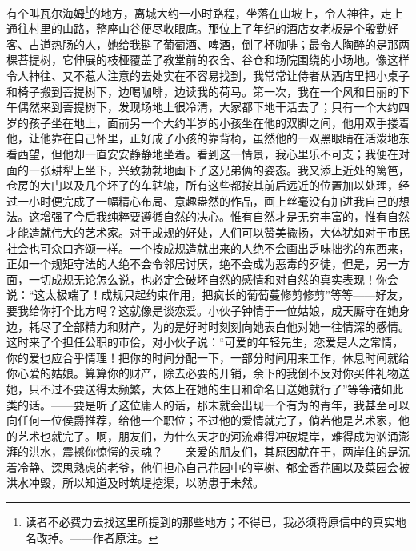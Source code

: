 \documentclass[12pt,oneside]{book}
\begin{document}
有个叫瓦尔海姆\footnote{读者不必费力去找这里所提到的那些地方；不得已，我必须将原信中的真实地名改掉。——作者原注。}的地方，离城大约一小时路程，坐落在山坡上，令人神往，走上通往村里的山路，整座山谷便尽收眼底。那位上了年纪的酒店女老板是个殷勤好客、古道热肠的人，她给我斟了葡萄酒、啤酒，倒了杯咖啡；最令人陶醉的是那两棵菩提树，它伸展的枝桠覆盖了教堂前的农舍、谷仓和场院围绕的小场地。像这样令人神往、又不惹人注意的去处实在不容易找到，我常常让侍者从酒店里把小桌子和椅子搬到菩提树下，边喝咖啡，边读我的荷马。第一次，我在一个风和日丽的下午偶然来到菩提树下，发现场地上很冷清，大家都下地干活去了；只有一个大约四岁的孩子坐在地上，面前另一个大约半岁的小孩坐在他的双脚之间，他用双手搂着他，让他靠在自己怀里，正好成了小孩的靠背椅，虽然他的一双黑眼睛在活泼地东看西望，但他却一直安安静静地坐着。看到这一情景，我心里乐不可支；我便在对面的一张耕犁上坐下，兴致勃勃地画下了这兄弟俩的姿态。我又添上近处的篱笆，仓房的大门以及几个坏了的车轱辘，所有这些都按其前后远近的位置加以处理，经过一小时便完成了一幅精心布局、意趣盎然的作品，画上丝毫没有加进我自己的想法。这增强了今后我纯粹要遵循自然的决心。惟有自然才是无穷丰富的，惟有自然才能造就伟大的艺术家。对于成规的好处，人们可以赞美揄扬，大体犹如对于市民社会也可众口齐颂一样。一个按成规造就出来的人绝不会画出乏味拙劣的东西来，正如一个规矩守法的人绝不会令邻居讨厌，绝不会成为恶毒的歹徒，但是，另一方面，一切成规无论怎么说，也必定会破坏自然的感情和对自然的真实表现！你会说：“这太极端了！成规只起约束作用，把疯长的葡萄蔓修剪修剪”等等——好友，要我给你打个比方吗？这就像是谈恋爱。小伙子钟情于一位姑娘，成天厮守在她身边，耗尽了全部精力和财产，为的是好时时刻刻向她表白他对她一往情深的感情。这时来了个担任公职的市侩，对小伙子说：“可爱的年轻先生，恋爱是人之常情，你的爱也应合乎情理！把你的时间分配一下，一部分时间用来工作，休息时间就给你心爱的姑娘。算算你的财产，除去必要的开销，余下的我倒不反对你买件礼物送她，只不过不要送得太频繁，大体上在她的生日和命名日送她就行了”等等诸如此类的话。——要是听了这位庸人的话，那末就会出现一个有为的青年，我甚至可以向任何一位侯爵推荐，给他一个职位；不过他的爱情就完了，倘若他是艺术家，他的艺术也就完了。啊，朋友们，为什么天才的河流难得冲破堤岸，难得成为汹涌澎湃的洪水，震撼你惊愕的灵魂？——亲爱的朋友们，其原因就在于，两岸住的是沉着冷静、深思熟虑的老爷，他们担心自己花园中的亭榭、郁金香花圃以及菜园会被洪水冲毁，所以知道及时筑堤挖渠，以防患于未然。
\end{document}
